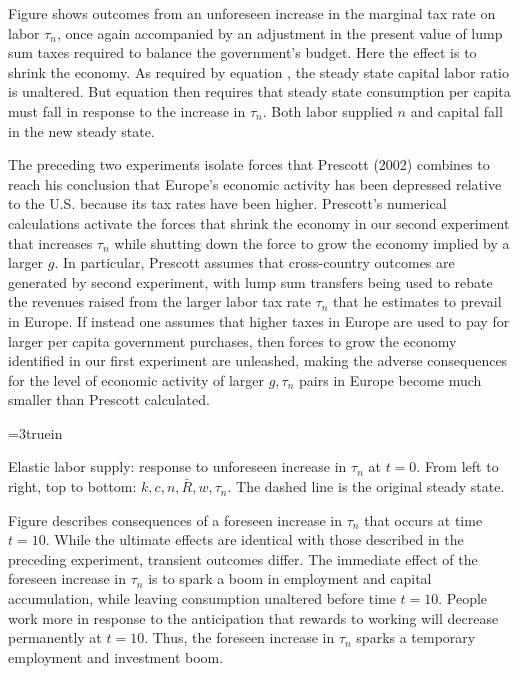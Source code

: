 \medskip
{}
Figure  shows outcomes from an unforeseen increase in the marginal tax rate on labor $\tau_n$, once again
accompanied by an adjustment in the present value of lump sum taxes required to balance the government's budget.
Here the effect is to shrink the economy.  As required by equation , the steady state
capital labor ratio is unaltered.  But equation  then requires that steady state consumption
per capita must fall in response to the increase in $\tau_n$.  Both labor supplied $n$ and capital fall in the new steady state.
\medskip

The preceding two experiments isolate forces that Prescott (2002) combines to reach his conclusion that Europe's
economic activity has been depressed relative to the U.S. because its tax rates have been higher.  Prescott's numerical
calculations activate the forces that shrink the economy in our second experiment that increases $\tau_n$  while shutting  down the force to grow
the economy implied by a larger $g$.  In particular, Prescott assumes that  cross-country outcomes are generated by  second experiment, with  lump sum transfers being used to rebate the revenues raised from the larger labor tax rate $\tau_n$ that  he estimates to prevail in  Europe.
If instead one assumes that higher taxes in Europe are used to pay for larger per capita government purchases, then  forces to grow the economy identified
in our first experiment are unleashed, making  the adverse consequences for the level of economic activity of larger $g, \tau_n$ pairs in Europe  become much smaller than Prescott calculated.
%

\centerline{\epsfxsize=3truein}
\caption{Elastic labor supply: response to unforeseen increase  in $\tau_n$ at $t=0$.
From left to right, top to bottom: $k, c, n, \bar R, w, \tau_n$. The dashed line is the original
steady state.}
\endfigure


\vfil\eject
\medskip
{}
Figure  describes consequences of a foreseen increase in $\tau_n$ that occurs at time $t=10$.   While the ultimate
effects are identical with those described in the preceding experiment,  transient outcomes differ.
The immediate effect of the foreseen increase in $\tau_n$ is to spark a boom in employment and capital accumulation, while leaving
consumption unaltered before time $t=10$.  People work more in response to the anticipation that rewards to working will decrease permanently
at $t=10$.  Thus, the foreseen increase in $\tau_n$ sparks a temporary employment and  investment boom.

